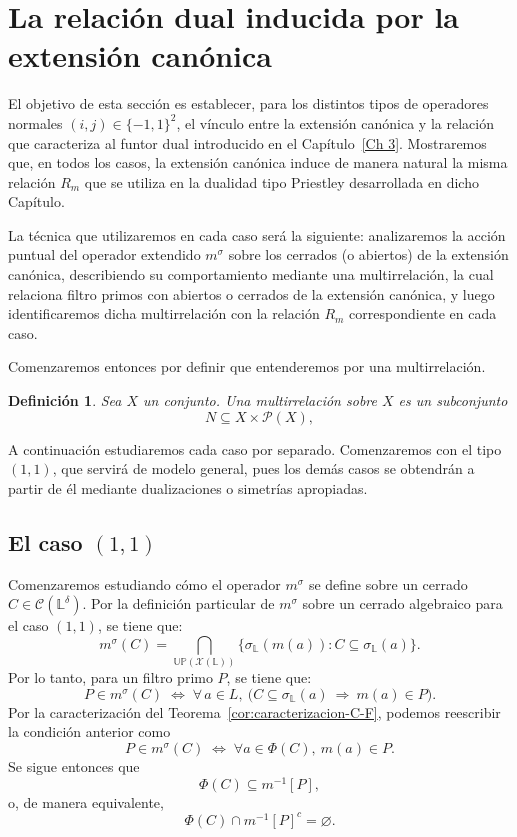 \documentclass[12pt]{book}
\newtheorem{definition}[theorem]{Definición}
\newcommand{\Up}{\mathbb{UP}}
\begin{document}
\section{La relación dual inducida por la extensión canónica}

El objetivo de esta sección es establecer, para los distintos tipos de
operadores normales $(i,j)\in\{-1,1\}^2$, el vínculo entre la extensión
canónica y la relación que caracteriza al funtor dual introducido en el
Capítulo~\ref{Ch 3}.
Mostraremos que, en todos los casos, la extensión canónica induce de manera
natural la misma relación $R_m$ que se utiliza en la dualidad tipo Priestley desarrollada en dicho Capítulo.

\vspace{0.2cm}

La técnica que utilizaremos en cada caso será la siguiente: analizaremos la acción puntual del
operador extendido $m^{\sigma}$ sobre los cerrados (o abiertos) de la extensión
canónica, describiendo su comportamiento mediante una multirrelación, la cual relaciona filtro primos con abiertos o cerrados de la extensión canónica, y luego identificaremos dicha
multirrelación con la relación $R_m$ correspondiente en cada caso.

Comenzaremos entonces por definir que entenderemos por una multirrelación.

\begin{definition}\label{def:multirrelacion}
Sea $X$ un conjunto.
Una \emph{multirrelación} sobre $X$ es un subconjunto
\[
N \subseteq X \times \mathcal{P}(X),
\]
\end{definition}
A continuación estudiaremos cada caso por separado.
Comenzaremos con el tipo $(1,1)$, que servirá de modelo general, pues
los demás casos se obtendrán a partir de él mediante dualizaciones o
simetrías apropiadas.

\subsection*{El caso $(1,1)$}

Comenzaremos estudiando cómo el operador $m^\sigma$ se define sobre un cerrado $C\in\mathcal{C}(\mathbb{L}^\delta)$.  Por la definición particular de $m^\sigma$ sobre un cerrado algebraico para el caso $(1,1)$, se tiene que:
\[
m^\sigma(C)=\bigcap_{\Up(\mathcal{X}(\mathbb L))}\{\sigma_{\mathbb L}(m(a)):C\subseteq
\sigma_{\mathbb L}(a)\}.
\]
Por lo tanto, para un filtro primo $P$, se tiene que:
\[
P\in m^\sigma(C)
\;\Longleftrightarrow\;
\forall\,a\in L,\ 
\bigl(C\subseteq\sigma_{\mathbb L}(a)\ \Rightarrow\ m(a)\in P\bigr).
\]
Por la caracterización del Teorema~\ref{cor:caracterizacion-C-F},
podemos reescribir la condición anterior como
\[
P\in m^\sigma(C)
\;\Longleftrightarrow\;
\forall a\in\Phi(C),\ m(a)\in P.
\]
Se sigue entonces que
\[
\Phi(C)\subseteq m^{-1}[P],
\]
o, de manera equivalente,
\[
\Phi(C)\cap m^{-1}[P]^c=\varnothing.
\]
\end{document}
